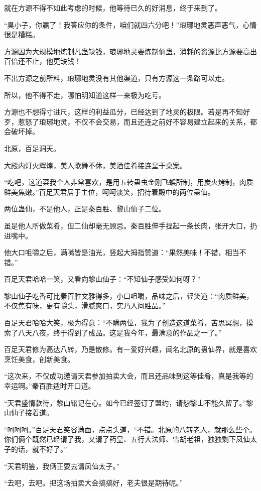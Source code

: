 \begin{this_body}
就在方源不得不如此考虑的时候，他等待已久的好消息，终于来到了。

“臭小子，你赢了！我答应你的条件，咱们就四六分吧！”琅琊地灵恶声恶气，心情很是糟糕。

方源因为大规模地炼制凡蛊缺钱，琅琊地灵要炼制仙蛊，消耗的资源比方源要高出百倍还不止，他更缺钱！

不出方源之前所料，琅琊地灵没有其他渠道，只有方源这一条路可以走。

所以，他不得不走，哪怕明知道这样一来极为吃亏。

方源也不想得寸进尺，这样的利益瓜分，已经达到了地灵的极限。若是再不知好歹，惹怒了琅琊地灵，不仅不会交易，而且还连之前好不容易建立起来的关系，都会破坏掉。

北原，百足洞天。

大殿内灯火辉煌，美人歌舞不休，美酒佳肴接连呈于桌案。

“吃吧，这道菜我个人非常喜欢，是用五转蛊虫金刚飞蜈所制，用炭火烤制，肉质鲜美焦嫩。”百足天君居于主位，呵呵淡笑，招待着殿中的两位蛊仙。

两位蛊仙，不是他人，正是秦百胜、黎山仙子二位。

虽是他人所做菜肴，但二仙却毫无顾忌。秦百胜伸手捏起一条长肉，张开大口，扔进嘴中。

他大口咀嚼之后，满嘴皆是油光，竖起大拇指赞道：“果然美味！不错，相当不错。”

百足天君哈哈一笑，又看向黎山仙子：“不知仙子感受如何呀？”

黎山仙子吃香可比秦百胜文雅得多，小口咀嚼，品味之后，轻笑道：“肉质鲜美，不仅焦有味，更有嚼头，滑腻爽口，实乃人间胜品。”

百足天君哈哈大笑，极为得意：“不瞒两位，我为了创造这道菜肴，苦思冥想，摸索了八天八夜，终于得到了成品。这是我今年，最满意的作品之一了。”

百足天君修为高达八转，乃是散修。有一爱好兴趣，闻名北原的蛊仙界，就是喜欢烹饪美食，创新美食。

“这次来，不仅成功邀请天君参加拍卖大会，而且还品味到这等佳肴，真是我等的幸运啊。”秦百胜适时开口道。

“天君盛情款待，黎山铭记在心。如今已经签订了盟约，请恕黎山不能久留了。”黎山仙子接着道。

“呵呵呵。”百足天君笑容满面，点点头道，“不错。北原的八转老人，就那么些个。你们俩个既然已经请了我，又请了药皇、五行大法师、雪胡老祖，独独剩下凤仙太子的话，就不好了。”

“天君明鉴，我俩正要去请凤仙太子。”

“去吧，去吧。把这场拍卖大会搞搞好，老夫很是期待呢。”


\end{this_body}
